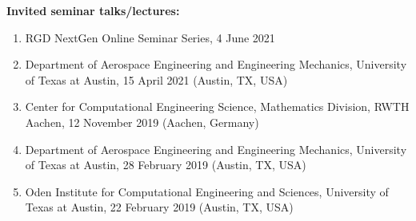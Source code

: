 \documentclass{resume} %
\begin{document}
{\bf Invited seminar talks/lectures:}
\begin{enumerate}
    \item RGD NextGen Online Seminar Series, 4 June 2021
    \item Department of Aerospace Engineering and Engineering Mechanics, University of Texas at Austin, 15 April 2021 (Austin, TX, USA)
    \item Center for Computational Engineering Science, Mathematics Division, RWTH Aachen, 12 November 2019 (Aachen, Germany)
    \item Department of Aerospace Engineering and Engineering Mechanics, University of Texas at Austin, 28 February 2019 (Austin, TX, USA)
    \item Oden Institute for Computational Engineering and Sciences, University of Texas at Austin, 22 February 2019 (Austin, TX, USA)
\end{enumerate}



\end{document}
